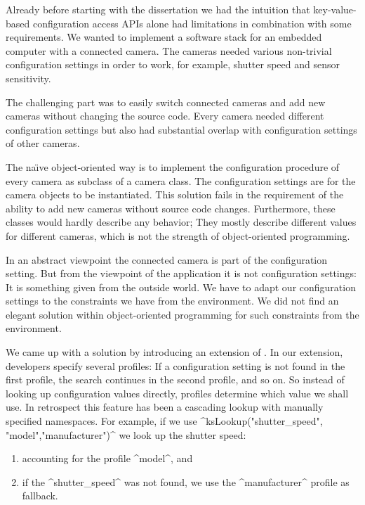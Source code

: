 Already before starting with the dissertation we had the intuition that key-value-based configuration access APIs alone had limitations in combination with some requirements.
We wanted to implement a software stack for an embedded computer with a connected camera.
The cameras needed various non-trivial configuration settings in order to work, for example, shutter speed and sensor sensitivity.

The challenging part was to easily switch connected cameras and add new cameras without changing the source code.
Every camera needed different configuration settings but also had substantial overlap with configuration settings of other cameras.

The na\"{\i}ve object-oriented way is to implement the configuration procedure of every camera as subclass of a camera class.
The configuration settings are for the camera objects to be instantiated.
This solution fails in the requirement of the ability to add new cameras without source code changes.
Furthermore, these classes would hardly describe any behavior;
They mostly describe different values for different cameras, which is not the strength of object-oriented programming.

In an abstract viewpoint the connected camera is part of the configuration setting.
But from the viewpoint of the application it is not configuration settings:
It is something given from the outside world.
We have to adapt our configuration settings to the constraints we have from the environment.
We did not find an elegant solution within object-oriented programming for such constraints from the environment.

We came up with a solution by introducing an extension of .
In our extension, developers specify several profiles:
If a configuration setting is not found in the first profile, the search continues in the second profile, and so on.
So instead of looking up configuration values directly, profiles determine which value we shall use.
In retrospect this feature has been a cascading lookup with manually specified namespaces.
For example, if we use ^ksLookup("shutter_speed", {"model","manufacturer"})^ we look up the shutter speed:
\begin{enumerate}
\item accounting for the profile ^model^, and
\item if the ^shutter_speed^ was not found, we use the ^manufacturer^ profile as fallback.
\end{enumerate}

